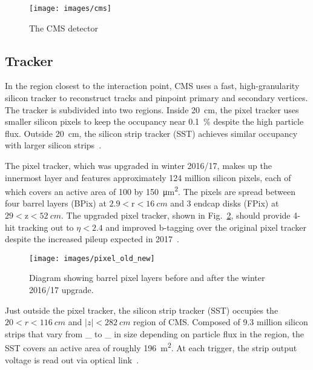 \documentclass[12pt]{article}
\begin{document}
        \noindent \begin{figure}[htbp] \begin{center}
        \texttt{[image: images/cms]}
            \caption{The CMS detector}
        \label{cms}
        \end{center} \end{figure}

    \subsection{Tracker}
        In the region closest to the interaction point, CMS uses a fast, high-granularity silicon tracker to reconstruct tracks and pinpoint primary and secondary vertices. The tracker is subdivided into two regions. Inside \SI{20}{cm}, the pixel tracker  uses smaller silicon pixels to keep the occupancy near \SI{0.1}{\percent} despite the high particle flux. Outside \SI{20}{\cm}, the silicon strip tracker (SST) achieves similar occupancy with larger silicon strips~\cite{cms_tdr}.  

        The pixel tracker, which was upgraded in winter 2016/17, makes up the innermost layer and features approximately \num{124} million silicon pixels, each of which covers an active area of \num{100} by \SI{150}{\micro\meter^2}. The pixels are spread between four barrel layers (BPix) at $\num{2.9}<\mathrm{r}<\SI{16}{cm}$ and 3 endcap disks (FPix) at $\num{29} < \mathrm{z} < \SI{52}{cm}$. The upgraded pixel tracker, shown in Fig.~\ref{pixel_old_new}, should provide 4-hit tracking out to $\eta < \num{2.4}$ and improved b-tagging over the original pixel tracker despite the increased pileup expected in 2017~\cite{cms_pixel_upgrade}.

        \noindent \begin{figure}[htbp] \begin{center}
            \texttt{[image: images/pixel\_old\_new]}
            \caption{Diagram showing barrel pixel layers before and after the winter 2016/17 upgrade.}
            \label{pixel_old_new}
        \end{center} \end{figure}
        
        Just outside the pixel tracker, the silicon strip tracker (SST) occupies the $\num{20} < r < \SI{116}{cm}$ and $\lvert z \rvert < \SI{282}{cm}$ region of CMS. Composed of \num{9.3} million silicon strips that vary from \_ to \_ in size  depending on particle flux in the region, the SST covers an active area of roughly \SI{196}{m^2}. At each trigger, the strip output voltage is read out via optical link~\cite{cms_pixel_upgrade}.
\end{document}
